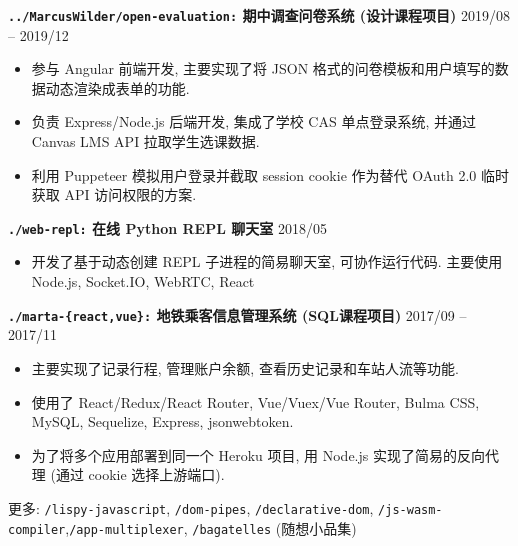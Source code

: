 \documentclass[10 pt]{article}
\begin{document}
\textbf{\texttt{../MarcusWilder/open-evaluation:} 期中调查问卷系统 (设计课程项目)} \hfill 2019/08 -- 2019/12
\begin{itemize}
\item 参与 Angular 前端开发, 主要实现了将 JSON 格式的问卷模板和用户填写的数据动态渲染成表单的功能.
\item 负责 Express/Node.js 后端开发, 集成了学校 CAS 单点登录系统, 并通过 Canvas LMS API 拉取学生选课数据.
\item 利用 Puppeteer 模拟用户登录并截取 session cookie 作为替代 OAuth 2.0 临时获取 API 访问权限的方案.
\end{itemize}

\textbf{\texttt{./web-repl:} 在线 Python REPL 聊天室}  \hfill 2018/05 
\begin{itemize}
\item 开发了基于动态创建 REPL 子进程的简易聊天室, 可协作运行代码. 主要使用 Node.js, Socket.IO, WebRTC, React
\end{itemize}

\textbf{\texttt{./marta-\{react,vue\}:} 地铁乘客信息管理系统 (SQL课程项目) } \hfill 2017/09 -- 2017/11
\begin{itemize}
\item 主要实现了记录行程, 管理账户余额, 查看历史记录和车站人流等功能.
\item 使用了 React/Redux/React Router, Vue/Vuex/Vue Router, Bulma  CSS, MySQL, Sequelize, Express, jsonwebtoken.
\item 为了将多个应用部署到同一个 Heroku 项目, 用 Node.js 实现了简易的反向代理 (通过 cookie 选择上游端口).
\end{itemize}

更多: \texttt{/lispy-javascript}, \texttt{/dom-pipes}, \texttt{/declarative-dom}, \texttt{/js-wasm-compiler},\texttt{/app-multiplexer}, \texttt{/bagatelles} (随想小品集)
\end{document}
